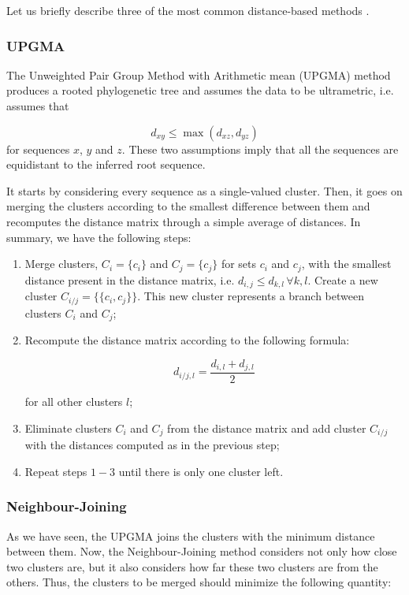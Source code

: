 Let us briefly describe three of the most common distance-based methods \cite{Z06}.

\subsubsection{UPGMA}

The Unweighted Pair Group Method with Arithmetic mean (UPGMA) method produces a rooted phylogenetic tree and assumes the data to be ultrametric, i.e. assumes that

$$d_{xy} \leq \max(d_{xz}, d_{yz})$$
for sequences $x$, $y$ and $z$. These two assumptions imply that all the sequences are equidistant to the inferred root sequence. 

It starts by considering every sequence as a single-valued cluster. Then, it goes on merging the clusters according to the smallest difference between them and recomputes the distance matrix through a simple average of distances. In summary, we have the following steps:


\begin{enumerate}
    \item Merge clusters, $C_i = \{ c_i \}$ and $C_j = \{ c_j \}$ for sets $c_i$ and $c_j$, with the smallest distance present in the distance matrix, i.e. $d_{i,j}\leq d_{k,l}\, \forall k, l$. Create a new cluster $C_{i/j} = \{ \{ c_i, c_j \} \}$. This new cluster represents a branch between clusters $C_i$ and $C_j$;
    \item Recompute the distance matrix according to the following formula:
    
    $$d_{i/j, l} = \frac{d_{i, l} + d_{j, l}}{2}$$
    
    for all other clusters $l$;
    \item Eliminate clusters $C_i$ and $C_j$ from the distance matrix and add cluster $C_{i/j}$ with the distances computed as in the previous step;
    \item Repeat steps $1-3$ until there is only one cluster left.
\end{enumerate}


\subsubsection{Neighbour-Joining}

As we have seen, the UPGMA joins the clusters with the minimum distance between them. Now, the Neighbour-Joining method considers not only how close two clusters are, but it also considers how far these two clusters are from the others. Thus, the clusters to be merged should minimize the following quantity:

